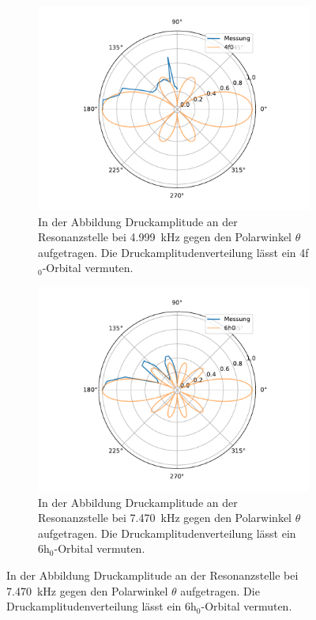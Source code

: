            \begin{figure}
                \centering
                \begin{subfigure}[b]{0.45\textwidth}
                    \centering
                    \includegraphics[scale=0.3]{./pictures/H_atom_resonanz_3_4999Hz.pdf}
                    \caption{In der Abbildung Druckamplitude an der Resonanzstelle bei \SI{4.999}{\kilo\hertz} gegen den Polarwinkel $\theta$ aufgetragen. Die Druckamplitudenverteilung lässt ein 4f$_0$-Orbital vermuten.}
                    \label{fig:H_atom_resonanz_3_4999Hz}
                \end{subfigure}
                \hfill
                \centering
                \begin{subfigure}[b]{0.45\textwidth}
                    \centering
                    \includegraphics[scale=0.3]{./pictures/H_atom_resonanz_4_7470Hz.pdf}
                    \caption{In der Abbildung Druckamplitude an der Resonanzstelle bei \SI{7.470}{\kilo\hertz} gegen den Polarwinkel $\theta$ aufgetragen. Die Druckamplitudenverteilung lässt ein 6h$_0$-Orbital vermuten.}
                    \label{fig:H_atom_resonanz_4_7470Hz}
                \end{subfigure}
            \end{figure}
              
